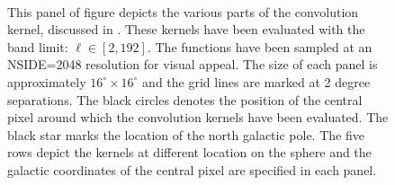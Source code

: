 \begin{figure}[t]
\hspace{-2mm}
\hspace{-2mm}
\hspace{-2mm}
\hspace{-2mm}
\hspace{-2mm}
\\[-2ex]
\hspace{-2mm}
\hspace{-2mm}
\hspace{-2mm}
\hspace{-2mm}
\hspace{-2mm}
\caption{This panel of figure depicts the various parts of the convolution kernel, discussed in . These kernels have been evaluated with the band limit: $\ell \in [2,192]$. The functions have been sampled at an NSIDE=2048 resolution for visual appeal. The size of each panel is approximately $16^{\circ} \times 16^{\circ}$ and the grid lines are marked at 2 degree separations. The black circles denotes the position of the central pixel around which the convolution kernels have been evaluated. The black star marks the location of the north galactic pole. The five rows depict the kernels at different location on the sphere and the galactic coordinates of the central pixel are specified in each panel.  }
\label{fig:vis_kernel}
 \end{figure}
%

